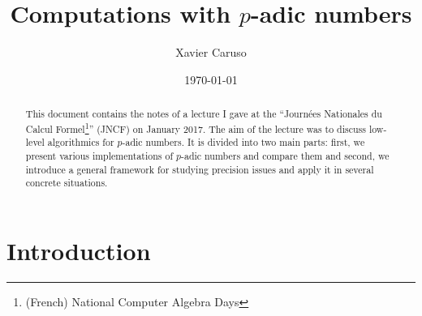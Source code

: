 \documentclass[11pt]{article}
\title{Computations with $p$-adic numbers}
\author{Xavier Caruso}
\date\today
\numberwithin{equation}{section}
\numberwithin{figure}{section}
\theoremstyle{definition}
\begin{document}
\maketitle

\begin{abstract}
This document contains the notes of a lecture I gave at the ``Journées 
Nationales du Calcul Formel\footnote{(French) National Computer Algebra 
Days}'' (JNCF) on January 2017. The aim of the lecture was to discuss 
low-level algorithmics for $p$-adic numbers. It is divided into two main 
parts: first, we present various implementations of $p$-adic numbers and 
compare them and second, we introduce a general framework for studying 
precision issues and apply it in several concrete situations.
\end{abstract}

\setcounter{tocdepth}{2}
\tableofcontents

\section*{Introduction}
\end{document}

